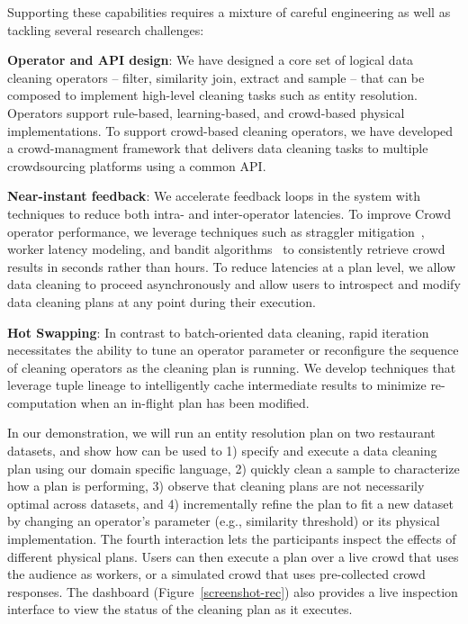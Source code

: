 Supporting these capabilities requires a mixture of careful engineering 
as well as tackling several research challenges:

\squishlist
\item {\bf Operator and API design}: We have designed a core set of logical data cleaning operators --
filter, similarity join, extract and sample -- that can be composed to
implement high-level cleaning tasks such as entity resolution.  Operators support
rule-based, learning-based, and crowd-based physical implementations. 
To support crowd-based cleaning operators, we have developed a crowd-managment 
framework that delivers data cleaning tasks to multiple crowdsourcing platforms using a common API.

\item {\bf Near-instant feedback}: We accelerate feedback loops in the system with techniques to reduce both 
intra- and inter-operator latencies. To improve Crowd operator performance, we leverage techniques such as straggler 
mitigation~\cite{venkataraman2014power}, worker latency modeling, and bandit algorithms~\cite{thompson1933likelihood}
to consistently retrieve crowd results in seconds rather than hours. To reduce latencies at a plan level, we allow data cleaning to 
proceed asynchronously and allow users to introspect and modify data cleaning plans at any point during their execution.

\item {\bf Hot Swapping}: In contrast to batch-oriented data cleaning, rapid iteration necessitates the
ability to tune an operator parameter or reconfigure the sequence of cleaning operators as the cleaning
plan is running.  We develop techniques that leverage tuple lineage to intelligently cache intermediate results to minimize
re-computation when an in-flight plan has been modified.
\squishend


In our demonstration, we will run an entity resolution plan on two restaurant datasets, and
show how \sys can be used to 1) specify and execute a data cleaning plan using our domain specific
language, 2) quickly clean a sample to characterize how a plan is performing, 
3) observe that cleaning plans are not necessarily optimal across datasets, and 
4) incrementally refine the plan to fit a new dataset by changing an operator's parameter (e.g., similarity threshold)
or its physical implementation.
The fourth interaction lets the participants inspect the effects of different physical plans.
Users can then execute a plan over a live crowd that uses the audience as workers, or a simulated crowd
that uses pre-collected crowd responses. The dashboard (Figure~\ref{screenshot-rec}) also provides a live inspection
interface to view the status of the cleaning plan as it executes.



